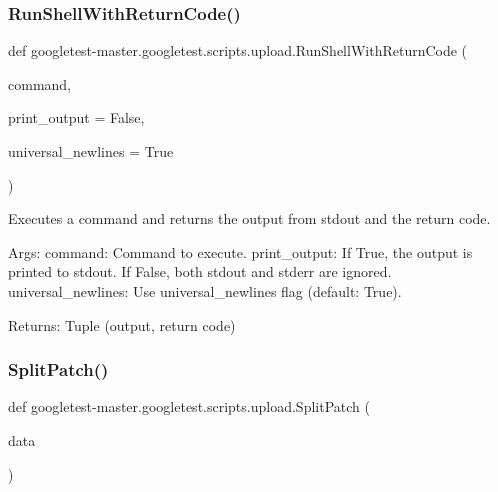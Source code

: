 \mbox{\label{namespacegoogletest-master_1_1googletest_1_1scripts_1_1upload_a945f111822c0912629048f532480fd3f}} 
\subsubsection{\texorpdfstring{RunShellWithReturnCode()}{RunShellWithReturnCode()}}
{\footnotesize\ttfamily def googletest-\/master.\+googletest.\+scripts.\+upload.\+Run\+Shell\+With\+Return\+Code (\begin{DoxyParamCaption}\item[{}]{command,  }\item[{}]{print\+\_\+output = {\ttfamily False},  }\item[{}]{universal\+\_\+newlines = {\ttfamily True} }\end{DoxyParamCaption})}

\begin{DoxyVerb}Executes a command and returns the output from stdout and the return code.

Args:
  command: Command to execute.
  print_output: If True, the output is printed to stdout.
                If False, both stdout and stderr are ignored.
  universal_newlines: Use universal_newlines flag (default: True).

Returns:
  Tuple (output, return code)
\end{DoxyVerb}
 \mbox{\label{namespacegoogletest-master_1_1googletest_1_1scripts_1_1upload_a90739e461b6862dcee407a71acb26f3d}} 
\subsubsection{\texorpdfstring{SplitPatch()}{SplitPatch()}}
{\footnotesize\ttfamily def googletest-\/master.\+googletest.\+scripts.\+upload.\+Split\+Patch (\begin{DoxyParamCaption}\item[{}]{data }\end{DoxyParamCaption})}

